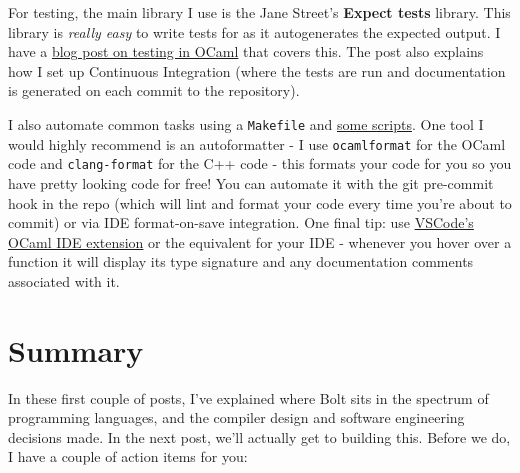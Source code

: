 For testing, the main library I use is the Jane Street's \textbf{Expect
tests} library. This library is \emph{really easy} to write tests for as
it autogenerates the expected output. I have a
\href{https://mukulrathi.com/ocaml-testing-frameworks/}{blog post on
testing in OCaml} that covers this. The post also explains how I set up
Continuous Integration (where the tests are run and documentation is
generated on each commit to the repository).

I also automate common tasks using a \texttt{Makefile} and
\href{https://github.com/mukul-rathi/bolt/tree/master/scripts}{some
scripts}. One tool I would highly recommend is an autoformatter - I use
\texttt{ocamlformat} for the OCaml code and \texttt{clang-format} for
the C++ code - this formats your code for you so you have pretty looking
code for free! You can automate it with the git pre-commit hook in the
repo (which will lint and format your code every time you're about to
commit) or via IDE format-on-save integration. One final tip: use
\href{https://marketplace.visualstudio.com/items?itemName=freebroccolo.reasonml}{VSCode's
OCaml IDE extension} or the equivalent for your IDE - whenever you hover
over a function it will display its type signature and any documentation
comments associated with it.

\hypertarget{summary}{%
\section{\texorpdfstring{\protect\hyperlink{summary}{}Summary}{Summary}}\label{summary}}

In these first couple of posts, I've explained where Bolt sits in the
spectrum of programming languages, and the compiler design and software
engineering decisions made. In the next post, we'll actually get to
building this. Before we do, I have a couple of action items for you:

